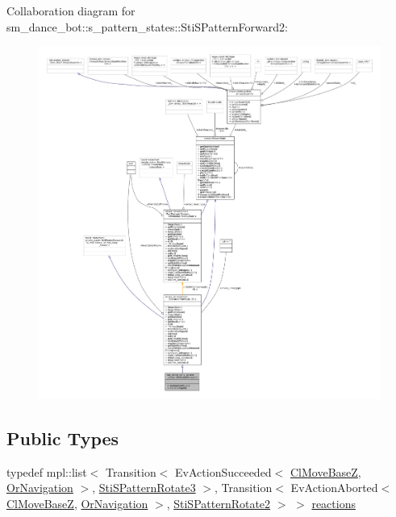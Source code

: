 Collaboration diagram for sm\+\_\+dance\+\_\+bot\+:\+:s\+\_\+pattern\+\_\+states\+:\+:Sti\+S\+Pattern\+Forward2\+:
\nopagebreak
\begin{figure}[H]
\begin{center}
\leavevmode
\includegraphics[width=350pt]{structsm__dance__bot_1_1s__pattern__states_1_1StiSPatternForward2__coll__graph}
\end{center}
\end{figure}
\subsection*{Public Types}
\begin{DoxyCompactItemize}
\item 
typedef mpl\+::list$<$ Transition$<$ Ev\+Action\+Succeeded$<$ \hyperlink{classmove__base__z__client_1_1ClMoveBaseZ}{Cl\+Move\+BaseZ}, \hyperlink{classsm__dance__bot_1_1OrNavigation}{Or\+Navigation} $>$, \hyperlink{structsm__dance__bot_1_1s__pattern__states_1_1StiSPatternRotate3}{Sti\+S\+Pattern\+Rotate3} $>$, Transition$<$ Ev\+Action\+Aborted$<$ \hyperlink{classmove__base__z__client_1_1ClMoveBaseZ}{Cl\+Move\+BaseZ}, \hyperlink{classsm__dance__bot_1_1OrNavigation}{Or\+Navigation} $>$, \hyperlink{structsm__dance__bot_1_1s__pattern__states_1_1StiSPatternRotate2}{Sti\+S\+Pattern\+Rotate2} $>$ $>$ \hyperlink{structsm__dance__bot_1_1s__pattern__states_1_1StiSPatternForward2_a011ca35b5117f84d48e426d04ef9ae9f}{reactions}
\end{DoxyCompactItemize}
